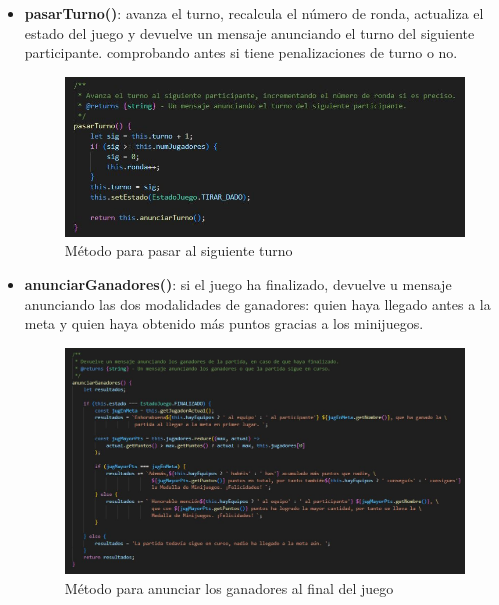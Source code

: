 \begin{itemize}
	\item \textbf{pasarTurno()}: avanza el turno, recalcula el número de ronda, actualiza el estado del juego y devuelve un mensaje anunciando el turno del siguiente participante. comprobando antes si tiene penalizaciones de turno o no.
	\begin{figure}[H]
		\centering
		\includegraphics{imgs/codigo-oca-5.jpg}
		\caption{Método para pasar al siguiente turno}
		\label{fig:codigo-oca-5}
	\end{figure} 
	
	\item \textbf{anunciarGanadores()}: si el juego ha finalizado, devuelve u mensaje anunciando las dos modalidades de ganadores: quien haya llegado antes a la meta y quien haya obtenido más puntos gracias a los minijuegos.
	\begin{figure}[H]
		\centering
		\includegraphics[width=1\textwidth]{imgs/codigo-oca-6.jpg}
		\caption{Método para anunciar los ganadores al final del juego}
		\label{fig:codigo-oca-6}
	\end{figure} 
	 

\end{itemize}

